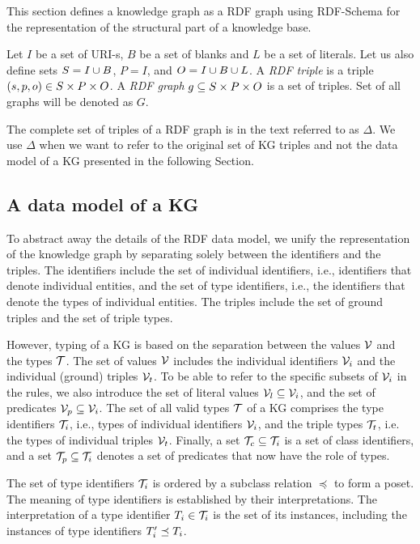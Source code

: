 \documentclass[runningheads]{llncs}
\newcommand{\V}{{\cal V}}
\newcommand{\T}{{\cal T}}
\begin{document}
This section defines a knowledge graph as a RDF graph \cite{rdf} using
RDF-Schema \cite{rdfschema} for the representation of the structural
part of a knowledge base. 

Let $I$ be a set of URI-s, $B$ be a set of blanks and $L$ be a set of
literals. Let us also define sets $S = I\cup\/B$, $P = I$, and
$O = I\cup\/B\cup\/L$. A \emph{RDF triple} is a triple
$(s,p,o)\in\/S\times\/P\times\/O$. A \emph{RDF graph}
$g\subseteq\/S\times\/P\times\/O$ is a set of triples. Set of all
graphs will be denoted as $G$.

The complete set of triples of a RDF graph is in the text
referred to as $\Delta$. We use $\Delta$ when we want to refer
to the original set of KG triples and not the data model of a KG
presented in the following Section.






\subsection{A data model of a KG}

To abstract away the details of the RDF data model, we unify the
representation of the knowledge graph by separating solely between the
identifiers and the triples. The identifiers include the set of
individual identifiers, i.e., identifiers that denote individual
entities, and the set of type identifiers, i.e., the identifiers that
denote the types of individual entities. The triples include the set
of ground triples and the set of triple types.

However, typing of a KG is based on the separation between the values
$\V$ and the types $\T$. The set of values $\V$ includes the
individual identifiers $\V_i$ and the individual (ground) triples
$\V_t$. To be able to refer to the specific subsets of $\V_i$ in the
rules, we also introduce the set of literal values
$\V_l\subseteq\V_i$, and the set of predicates
$\V_p\subseteq\V_i$. The set of all valid types $\T$ of a KG comprises
the type identifiers $\T_i$, i.e., types of individual identifiers
$\V_i$, and the triple types $\T_t$, i.e. the types of individual
triples $\V_t$.  Finally, a set $\T_c\subseteq\T_i$ is a set of class
identifiers, and a set $\T_p\subseteq\T_i$ denotes a set of predicates
that now have the role of types.

The set of type identifiers $\T_i$ is ordered by a subclass relation
$\preceq$ to form a poset. The meaning of type identifiers is
established by their interpretations. The interpretation of a type
identifier $T_i\in\T_i$ is the set of its instances, including the
instances of type identifiers $T_i'\preceq\/T_i$.
\end{document}
